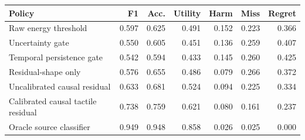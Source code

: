 \begin{tabular}{lrrrrrr}
\toprule
Policy & F1 & Acc. & Utility & Harm & Miss & Regret \\
\midrule
Raw energy threshold & 0.597 & 0.625 & 0.491 & 0.152 & 0.223 & 0.366 \\
Uncertainty gate & 0.550 & 0.605 & 0.451 & 0.136 & 0.259 & 0.407 \\
Temporal persistence gate & 0.542 & 0.594 & 0.433 & 0.145 & 0.260 & 0.425 \\
Residual-shape only & 0.576 & 0.655 & 0.486 & 0.079 & 0.266 & 0.372 \\
Uncalibrated causal residual & 0.633 & 0.681 & 0.524 & 0.094 & 0.225 & 0.334 \\
Calibrated causal tactile residual & 0.738 & 0.759 & 0.621 & 0.080 & 0.161 & 0.237 \\
Oracle source classifier & 0.949 & 0.948 & 0.858 & 0.026 & 0.025 & 0.000 \\
\bottomrule
\end{tabular}
